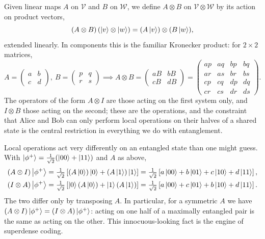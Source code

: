 \documentclass[a4paper]{scrartcl}
\newcommand{\Vs}{\mathcal{V}}
\newcommand{\Ws}{\mathcal{W}}
\begin{document}
Given linear maps $A$ on $\Vs$ and $B$ on $\Ws$, we define $A \otimes B$ on $\Vs\otimes\Ws$ by its action on product vectors,
$$(A\otimes B)\left(\ket{v}\otimes\ket{w}\right) = (A\ket{v})\otimes(B\ket{w}),$$
extended linearly. In components this is the familiar Kronecker product: for $2\times2$ matrices,
$$A = \begin{pmatrix} a & b \\ c & d\end{pmatrix},\ B = \begin{pmatrix} p & q \\ r & s\end{pmatrix} \implies A \otimes B = \begin{pmatrix} aB & bB \\ cB & dB\end{pmatrix} = \begin{pmatrix} ap & aq & bp & bq \\ ar & as & br & bs \\ cp & cq & dp & dq \\ cr & cs & dr & ds \end{pmatrix}.$$
The operators of the form $A \otimes I$ are those acting on the first system only, and $I \otimes B$ those acting on the second; these are the  operations, and the constraint that Alice and Bob can only perform local operations on their halves of a shared state is the central restriction in everything we do with entanglement.

\begin{example}
	Local operations act very differently on an entangled state than one might guess. With $\ket{\phi^+} = \tfrac{1}{\sqrt2}(\ket{00}+\ket{11})$ and $A$ as above,
	\begin{align*}
		(A\otimes I)\ket{\phi^+} &= \tfrac{1}{\sqrt2}\left[(A\ket{0})\ket{0} + (A\ket{1})\ket{1}\right] = \tfrac{1}{\sqrt2}\left[a\ket{00} + b\ket{01} + c\ket{10} + d\ket{11}\right], \\
		(I\otimes A)\ket{\phi^+} &= \tfrac{1}{\sqrt2}\left[\ket{0}(A\ket{0}) + \ket{1}(A\ket{1})\right] = \tfrac{1}{\sqrt2}\left[a\ket{00} + c\ket{01} + b\ket{10} + d\ket{11}\right].
	\end{align*}
	The two differ only by transposing $A$. In particular, for a symmetric $A$ we have $(A\otimes I)\ket{\phi^+} = (I\otimes A)\ket{\phi^+}$: acting on one half of a maximally entangled pair is the same as acting on the other. This innocuous-looking fact is the engine of superdense coding.
\end{example}
\end{document}
